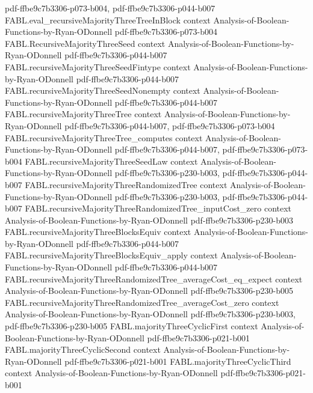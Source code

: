 \begin{theorem}
  {pdf-ffbe9c7b3306-p073-b004,
    pdf-ffbe9c7b3306-p044-b007}
\proofstep
  {FABL.eval_recursiveMajorityThreeTreeInBlock}
  {context}
  {Analysis-of-Boolean-Functions-by-Ryan-ODonnell}
  {pdf-ffbe9c7b3306-p073-b004}
\proofstep
  {FABL.RecursiveMajorityThreeSeed}
  {context}
  {Analysis-of-Boolean-Functions-by-Ryan-ODonnell}
  {pdf-ffbe9c7b3306-p044-b007}
\proofstep
  {FABL.recursiveMajorityThreeSeedFintype}
  {context}
  {Analysis-of-Boolean-Functions-by-Ryan-ODonnell}
  {pdf-ffbe9c7b3306-p044-b007}
\proofstep
  {FABL.recursiveMajorityThreeSeedNonempty}
  {context}
  {Analysis-of-Boolean-Functions-by-Ryan-ODonnell}
  {pdf-ffbe9c7b3306-p044-b007}
\proofstep
  {FABL.recursiveMajorityThreeTree}
  {context}
  {Analysis-of-Boolean-Functions-by-Ryan-ODonnell}
  {pdf-ffbe9c7b3306-p044-b007,
    pdf-ffbe9c7b3306-p073-b004}
\proofstep
  {FABL.recursiveMajorityThreeTree_computes}
  {context}
  {Analysis-of-Boolean-Functions-by-Ryan-ODonnell}
  {pdf-ffbe9c7b3306-p044-b007,
    pdf-ffbe9c7b3306-p073-b004}
\proofstep
  {FABL.recursiveMajorityThreeSeedLaw}
  {context}
  {Analysis-of-Boolean-Functions-by-Ryan-ODonnell}
  {pdf-ffbe9c7b3306-p230-b003,
    pdf-ffbe9c7b3306-p044-b007}
\proofstep
  {FABL.recursiveMajorityThreeRandomizedTree}
  {context}
  {Analysis-of-Boolean-Functions-by-Ryan-ODonnell}
  {pdf-ffbe9c7b3306-p230-b003,
    pdf-ffbe9c7b3306-p044-b007}
\proofstep
  {FABL.recursiveMajorityThreeRandomizedTree_inputCost_zero}
  {context}
  {Analysis-of-Boolean-Functions-by-Ryan-ODonnell}
  {pdf-ffbe9c7b3306-p230-b003}
\proofstep
  {FABL.recursiveMajorityThreeBlocksEquiv}
  {context}
  {Analysis-of-Boolean-Functions-by-Ryan-ODonnell}
  {pdf-ffbe9c7b3306-p044-b007}
\proofstep
  {FABL.recursiveMajorityThreeBlocksEquiv_apply}
  {context}
  {Analysis-of-Boolean-Functions-by-Ryan-ODonnell}
  {pdf-ffbe9c7b3306-p044-b007}
\proofstep
  {FABL.recursiveMajorityThreeRandomizedTree_averageCost_eq_expect}
  {context}
  {Analysis-of-Boolean-Functions-by-Ryan-ODonnell}
  {pdf-ffbe9c7b3306-p230-b005}
\proofstep
  {FABL.recursiveMajorityThreeRandomizedTree_averageCost_zero}
  {context}
  {Analysis-of-Boolean-Functions-by-Ryan-ODonnell}
  {pdf-ffbe9c7b3306-p230-b003,
    pdf-ffbe9c7b3306-p230-b005}
\proofstep
  {FABL.majorityThreeCyclicFirst}
  {context}
  {Analysis-of-Boolean-Functions-by-Ryan-ODonnell}
  {pdf-ffbe9c7b3306-p021-b001}
\proofstep
  {FABL.majorityThreeCyclicSecond}
  {context}
  {Analysis-of-Boolean-Functions-by-Ryan-ODonnell}
  {pdf-ffbe9c7b3306-p021-b001}
\proofstep
  {FABL.majorityThreeCyclicThird}
  {context}
  {Analysis-of-Boolean-Functions-by-Ryan-ODonnell}
  {pdf-ffbe9c7b3306-p021-b001}

\end{theorem}
